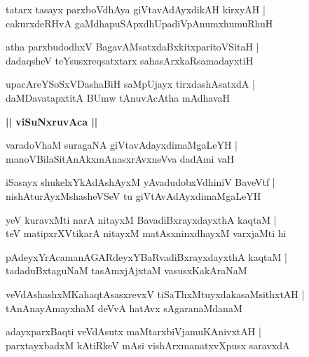 \documentclass[twoside,12pt,openright]{book}
\newcounter{shloka}[chapter]
\def\uvaca#1{\centerline{{\large\textbf{#1}}}}
\begin{document}
\begin{shloka}%
tatarx tasayx parxboVdhAya giVtavAdAyxdikAH kirxyAH |\\
cakurxdeRHvA gaMdhapuSApxdhUpadiVpAnumxhumuRhuH
\end{shloka}

\begin{shloka}%
atha parxbudodhxV BagavAMsatxdaBxkitxparitoVSitaH |\\
dadaqsheV teYsusxreqsatxtarx sahasArxkaRsamadayxtiH 
\end{shloka}

\begin{shloka}%
upacAreYSoSxVDashaBiH saMpUjayx tirxdashAsatxdA |\\
daMDavatapxtitA BUmw tAnuvAcAtha mAdhavaH 
\end{shloka}

\uvaca{|| viSuNxruvAca ||}

\begin{shloka}%
varadoVhaM suragaNA giVtavAdayxdimaMgaLeYH |\\
manoVBilaSitAnAkxmAnasxrAvxneVva dadAmi vaH 
\end{shloka}

\begin{shloka}%
iSasayx shukelxYkAdAshAyxM yAvadudobxVdhiniV BaveVtf |\\
nishAturAyxMshasheVSeV tu giVtAvAdAyxdimaMgaLeYH 
\end{shloka}

\begin{shloka}%
yeV kuravxMti narA nitayxM BavadiBxrayxdayxthA kaqtaM |\\
teV matipxrXVtikarA nitayxM matAsxninxdhayxM varxjaMti hi 
\end{shloka}

\begin{shloka}%
pAdeyxYrAcamanAGARdeyxYBaRvadiBxrayxdayxthA kaqtaM |\\
tadaduBxtaguNaM tasAmxjAjxtaM vasusxKakAraNaM 
\end{shloka}

\begin{shloka}%
veVdAshashxMKahaqtAsasxrevxV tiSaThxMtuyxdakasaMsithxtAH |\\
tAnAnayAmayxhaM deVvA hatAvx sAgaranaMdanaM 
\end{shloka}

\begin{shloka}%
adayxparxBaqti veVdAsutx maMtarxbiVjamuKAnivxtAH |\\
parxtayxbadxM kAtiRkeV mAsi vishArxmanatxvXpusx saravxdA 
\end{shloka}
\end{document}
